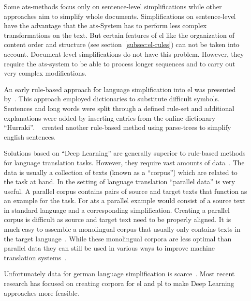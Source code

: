 Some \gls{ats}-methods focus only on sentence-level simplifications while other approaches aim to simplify whole documents.
Simplifications on sentence-level have the advantage that the \gls{ats}-System has to perform less complex transformations on the text.
But certain features of \gls{el} like the organization of content order and structure (see section~\ref{subsec:el-rules}) can not be taken into account. %
Document-level simplifications do not have this problem.
However, they require the \gls{ats}-system to be able to process longer sequences and to carry out very complex modifications.

An early rule-based approach for language simplification into \gls{el} was presented by~\autocite{suter2016}.
This approach employed dictionaries to substitute difficult symbols.
Sentences and long words were split through a defined rule-set and additional explanations were added by inserting entries from the online dictionary \enquote{Hurraki}.
~\autocite{Garain2019} created another rule-based method using parse-trees to simplify english sentences.

Solutions based on \enquote{Deep Learning} are generally superior to rule-based methods for language translation tasks.
However, they require vast amounts of data~\autocite{otter2019survey}.
The data is usually a collection of texts (known as a \enquote{corpus}) which are related to the task at hand.
In the setting of language translation \enquote{parallel data} is very useful.
A parallel corpus contains pairs of source and target texts that function as an example for the task.
For \gls{ats} a parallel example would consist of a source text in standard language and a corresponding simplification.
Creating a parallel corpus is difficult as source and target text need to be properly aligned.
It is much easy to assemble a monolingual corpus that usually only contains texts in the target language~\autocite{chan2023routledge}.
While these monolingual corpora are less optimal than parallel data they can still be used in various ways to improve machine translation systems~\autocite{lample2018unsupervised, burlot2019using, chan2023routledge}.

Unfortunately data for german language simplification is scarce~\autocite{Ansch_tz_2023}.
Most recent research has focused on creating corpora for \gls{el} and \gls{pl} to make Deep Learning approaches more feasible.

